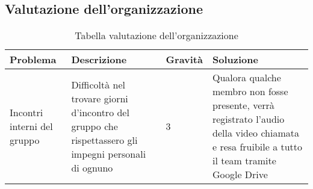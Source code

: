 \subsection{Valutazione dell'organizzazione}

{

\centering
\renewcommand{\arraystretch}{2}
\begin{longtable}{C{2cm} C{5cm} C{2cm} C{5.2cm}}
\caption{Tabella valutazione dell'organizzazione}\\
\textbf{Problema} &
\textbf{Descrizione}&
\textbf{Gravità}&
\textbf{Soluzione}\\
\endhead


Incontri interni del gruppo & Difficoltà nel trovare giorni d'incontro del gruppo che rispettassero gli impegni personali di ognuno & 3 & Qualora qualche membro non fosse presente, verrà registrato l'audio della video chiamata e resa fruibile a tutto il team tramite Google Drive\\


\end{longtable}
}
